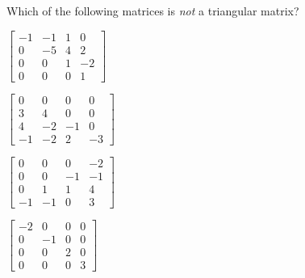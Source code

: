 \begin{activity}
Which of the following matrices is \emph{not} a triangular matrix?
\begin{parts}
\item \(\begin{bmatrix} -1&-1&1&0
\\0&-5&4&2
\\0&0&1&-2
\\0&0&0&1 \end{bmatrix}\)
\item \(\begin{bmatrix} 0&0&0&0
\\3&4&0&0
\\4&-2&-1&0
\\-1&-2&2&-3 \end{bmatrix}\)
\item \(\begin{bmatrix} 0&0&0&-2
\\0&0&-1&-1
\\0&1&1&4
\\-1&-1&0&3 \end{bmatrix}\)
\item \(\begin{bmatrix} -2&0&0&0
\\0&-1&0&0
\\0&0&2&0
\\0&0&0&3 \end{bmatrix}\)
\end{parts}
\end{activity}




